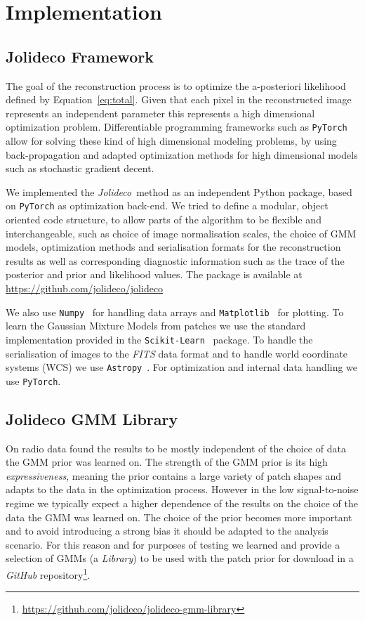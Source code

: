 \documentclass[twocolumn]{aastex631}
\newcommand{\jolideco}{\textit{Jolideco}~}
\begin{document}
    \section{Implementation}
    \subsection{Jolideco Framework}
    The goal of the reconstruction process is to optimize the a-posteriori
    likelihood defined by Equation~\ref{eq:total}. Given that each pixel
    in the reconstructed image represents an independent parameter
    this represents a high dimensional optimization problem.
    Differentiable programming frameworks such as \texttt{PyTorch}~\citep{Pytorch2019}
    allow for solving these kind of high dimensional modeling problems, by using
    back-propagation and adapted optimization methods for high dimensional
    models such as stochastic gradient decent.

    We implemented the \jolideco method as an independent Python package, 
    based on \texttt{PyTorch} as optimization back-end. We tried to define a modular,
    object oriented code structure, to allow parts of the algorithm to be
    flexible and interchangeable, such as choice of image normalisation scales,
    the choice of GMM models, optimization methods and serialisation formats for the 
    reconstruction results as well as corresponding diagnostic information
    such as the trace of the posterior and prior and likelihood values.
    The package is available at \url{https://github.com/jolideco/jolideco}

    We also use \texttt{Numpy}~\citep{Numpy2020} for handling data arrays and
    \texttt{Matplotlib}~\citep{Hunter2007} for plotting.
    To learn the Gaussian Mixture Models from patches we use the standard implementation
    provided in the \texttt{Scikit-Learn}~\citep{Skimage2014} package. To handle the 
    serialisation of images to the \textit{FITS} data format and to handle world coordinate
    systems (WCS) we use \texttt{Astropy}~\citep{Astropy2018}.
    For optimization and internal data handling we use \texttt{PyTorch}.

    \subsection{Jolideco GMM Library}
    \label{ssec:jolideco-gmm-library}
    On radio data \cite{Bouman2016} found the results to be mostly independent of the choice of data the GMM prior was learned on. The strength of the GMM prior is its high \textit{expressiveness}, meaning the prior contains a large variety of patch shapes and adapts to the data in the optimization process. However in the low signal-to-noise regime we typically expect a higher dependence of the results on the choice of the data the GMM was learned on. The choice of the prior becomes more important and to avoid introducing a strong bias it should be adapted to the analysis scenario. For this reason and for purposes of testing we learned and provide a selection of GMMs (a \textit{Library}) to be used with the patch prior for download in a \textit{GitHub} repository\footnote{\url{https://github.com/jolideco/jolideco-gmm-library}}.
    
\end{document}
